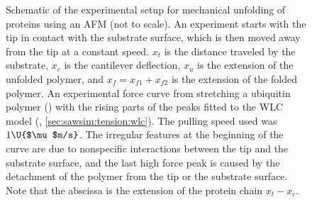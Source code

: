 \begin{figure}
  \begin{center}
  \hspace{.25in}%
  \caption{\protect{} Schematic of the
    experimental setup for mechanical unfolding of proteins using an
    AFM (not to scale).  An experiment starts with the tip in contact
    with the substrate surface, which is then moved away from the tip
    at a constant speed.  $x_t$ is the distance traveled by the
    substrate, $x_c$ is the cantilever deflection, $x_u$ is the
    extension of the unfolded polymer, and $x_f=x_{f1}+x_{f2}$ is the
    extension of the folded polymer.
    \protect{} An experimental force curve
    from stretching a ubiquitin polymer () with the
    rising parts of the peaks fitted to the WLC model
    (, \cref{sec:sawsim:tension:wlc})\citep{chyan04}.
    The pulling speed used was $1\U{$\mu$m/s}$.  The irregular
    features at the beginning of the curve are due to nonspecific
    interactions between the tip and the substrate surface, and the
    last high force peak is caused by the detachment of the polymer
    from the tip or the substrate surface.  Note that the abscissa is
    the extension of the protein chain
    $x_t-x_c$.\label{fig:procedure}}
  \end{center}
\end{figure}
